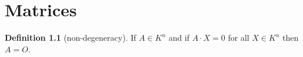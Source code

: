 \documentclass{book}
\theoremstyle{definition}
\newtheorem{definition}{Definition}[section]
\begin{document}
\chapter{Matrices}
\begin{definition}[non-degeneracy]
    If $A \in K^n$ and if $A \cdot X = 0$ for all $X \in K^n$ then $A = O$.
\end{definition}


% 
\end{document}
